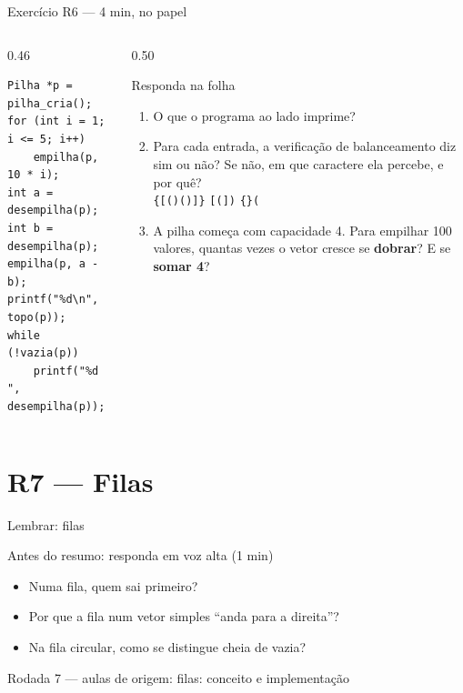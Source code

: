 \documentclass[aspectratio=169]{beamer}
\newcommand{\rodada}[4]{%
  \begin{frame}{Lembrar: #2}
    \begin{block}{Antes do resumo: responda em voz alta (1 min)}
      #4
    \end{block}
    \vfill
    {\small\textcolor{UFSGray}{Rodada #1 --- aulas de origem:} #3}
  \end{frame}}
\begin{document}
\begin{frame}[fragile]{Exercício R6 --- 4 min, no papel}
  \begin{columns}[T]
    \begin{column}{0.46\textwidth}
\begin{lstlisting}[style=numC]
Pilha *p = pilha_cria();
for (int i = 1; i <= 5; i++)
    empilha(p, 10 * i);
int a = desempilha(p);
int b = desempilha(p);
empilha(p, a - b);
printf("%d\n", topo(p));
while (!vazia(p))
    printf("%d ", desempilha(p));
\end{lstlisting}
    \end{column}
    \begin{column}{0.50\textwidth}
      \begin{block}{Responda na folha}
        \scriptsize
        \begin{enumerate}
          \item[(a)] O que o programa ao lado imprime?
          \item[(b)] Para cada entrada, a verificação de balanceamento diz
            sim ou não? Se não, em que caractere ela percebe, e por quê?\\
            \texttt{\{[()()]\}} \quad \texttt{[(])} \quad \texttt{\{\}(}
          \item[(c)] A pilha começa com capacidade 4. Para empilhar 100
            valores, quantas vezes o vetor cresce se \textbf{dobrar}? E se
            \textbf{somar 4}?
        \end{enumerate}
      \end{block}
    \end{column}
  \end{columns}
\end{frame}

\section{R7 --- Filas}

\rodada{7}{filas}{filas: conceito e implementação}{
  \begin{itemize}
    \item Numa fila, quem sai primeiro?
    \item Por que a fila num vetor simples ``anda para a direita''?
    \item Na fila circular, como se distingue cheia de vazia?
  \end{itemize}}
\end{document}
